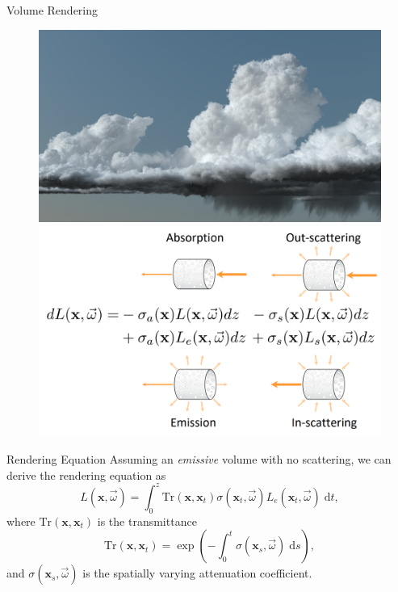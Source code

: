 \documentclass[10pt]{beamer}
\newcommand{\bx}{\mathbf{x}}
\begin{document}
 {
  \begin{frame}{Volume Rendering}
      \begin{figure}
          \centering
          \includegraphics[width=0.6\linewidth]{figures/vol/volume.png} \\ \vspace{0.5em}
          \includegraphics[width=0.5\linewidth]{figures/vol/rte.png}
      \end{figure}
  \end{frame}
 }

\begin{frame}{Rendering Equation}
    Assuming an \emph{emissive} volume with no scattering, we can derive the \alert{rendering equation} as
    \begin{equation*}
        L(\bx, \vec{\omega}) = \int_0^z \mathrm{Tr}(\bx, \bx_t) \sigma(\bx_t, \vec{\omega}) L_e(\bx_t, \vec{\omega})  \; \mathrm{d}t,
    \end{equation*}
    where \(\mathrm{Tr}(\bx, \bx_t)\) is the \alert{transmittance}
    \begin{equation*}
        \mathrm{Tr}(\bx, \bx_t) = \exp\left(-\int_0^t \sigma(\bx_s, \vec{\omega}) \;\mathrm{d}s\right),
    \end{equation*}
    and \(\sigma(\bx_s, \vec{\omega})\) is the spatially varying \alert{attenuation coefficient}.
\end{frame}
\end{document}
